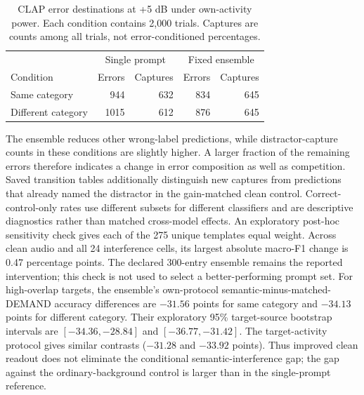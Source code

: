 \begin{table}[htbp]\centering
\caption{CLAP error destinations at +5 dB under own-activity power. Each condition contains 2,000 trials. Captures are counts among all trials, not error-conditioned percentages.}
\begin{tabular}{lrrrr}\toprule & \multicolumn{2}{c}{Single prompt} & \multicolumn{2}{c}{Fixed ensemble}\\
Condition & Errors & Captures & Errors & Captures\\\midrule
Same category & 944 & 632 & 834 & 645 \\
Different category & 1015 & 612 & 876 & 645 \\
\bottomrule\end{tabular}\end{table}
The ensemble reduces other wrong-label predictions, while distractor-capture
counts in these conditions are slightly higher. A larger fraction of the
remaining errors therefore indicates a change in error composition as well as
competition. Saved transition tables additionally distinguish new captures from
predictions that already named the distractor in the gain-matched clean control.
Correct-control-only rates use different subsets for different classifiers and
are descriptive diagnostics rather than matched cross-model effects.
An exploratory post-hoc sensitivity check gives each of the 275 unique templates equal weight. Across clean audio and all 24 interference cells, its largest absolute macro-F1 change is 0.47 percentage points. The declared 300-entry ensemble remains the reported intervention; this check is not used to select a better-performing prompt set.
For high-overlap targets, the ensemble's own-protocol
semantic-minus-matched-DEMAND accuracy differences are $-31.56$ points for same
category and $-34.13$ points for different category. Their exploratory 95\%
target-source bootstrap intervals are $[-34.36,-28.84]$ and $[-36.77,-31.42]$.
The target-activity protocol gives similar contrasts ($-31.28$ and $-33.92$
points). Thus improved clean readout does not eliminate the conditional
semantic-interference gap; the gap against the ordinary-background control is
larger than in the single-prompt reference.

